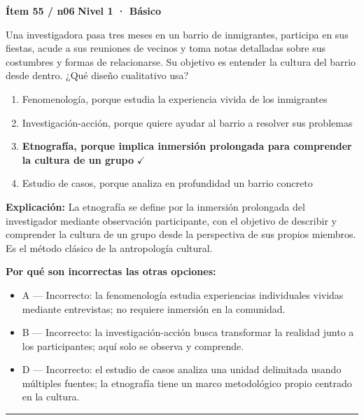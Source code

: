\documentclass[12pt,a4paper]{article}
\begin{document}
\begin{mdframed}[backgroundcolor=fondogris,linecolor=azul,linewidth=1pt,innerleftmargin=10pt,innerrightmargin=10pt,innertopmargin=7pt,innerbottommargin=7pt]
\textbf{Ítem 55 / n06} \hfill {\small\bfseries\color{azul} Nivel 1 · Básico}
\end{mdframed}

Una investigadora pasa tres meses en un barrio de inmigrantes, participa en sus fiestas, acude a sus reuniones de vecinos y toma notas detalladas sobre sus costumbres y formas de relacionarse. Su objetivo es entender la cultura del barrio desde dentro. ¿Qué diseño cualitativo usa?

\begin{enumerate}
  \item[A.] Fenomenología, porque estudia la experiencia vivida de los inmigrantes
  \item[B.] Investigación-acción, porque quiere ayudar al barrio a resolver sus problemas
  \item[\textbf{\color{verde}C.}] \textbf{\color{verde} Etnografía, porque implica inmersión prolongada para comprender la cultura de un grupo} \hfill $\checkmark$
  \item[D.] Estudio de casos, porque analiza en profundidad un barrio concreto
\end{enumerate}

\noindent\textbf{\color{azul}Explicación:} La etnografía se define por la inmersión prolongada del investigador mediante observación participante, con el objetivo de describir y comprender la cultura de un grupo desde la perspectiva de sus propios miembros. Es el método clásico de la antropología cultural.

\noindent\textbf{\color{gris}Por qué son incorrectas las otras opciones:}
\begin{itemize}
  \item {\small A — Incorrecto: la fenomenología estudia experiencias individuales vividas mediante entrevistas; no requiere inmersión en la comunidad.}
  \item {\small B — Incorrecto: la investigación-acción busca transformar la realidad junto a los participantes; aquí solo se observa y comprende.}
  \item {\small D — Incorrecto: el estudio de casos analiza una unidad delimitada usando múltiples fuentes; la etnografía tiene un marco metodológico propio centrado en la cultura.}
\end{itemize}
\vspace{8pt}\hrule\vspace{10pt}
\end{document}
